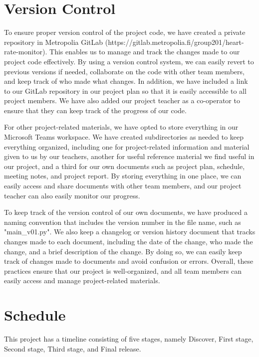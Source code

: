 \documentclass{article}
\begin{document}
\section{Version Control}
To ensure proper version control of the project code, we have created a private repository in Metropolia GitLab (https://gitlab.metropolia.fi/group201/heart-rate-monitor). This enables us to manage and track the changes made to our project code effectively. By using a version control system, we can easily revert to previous versions if needed, collaborate on the code with other team members, and keep track of who made what changes. In addition, we have included a link to our GitLab repository in our project plan so that it is easily accessible to all project members. We have also added our project teacher as a co-operator to ensure that they can keep track of the progress of our code.



For other project-related materials, we have opted to store everything in our Microsoft Teams workspace. We have created subdirectories as needed to keep everything organized, including one for project-related information and material given to us by our teachers, another for useful reference material we find useful in our project, and a third for our own documents such as project plan, schedule, meeting notes, and project report. By storing everything in one place, we can easily access and share documents with other team members, and our project teacher can also easily monitor our progress.

To keep track of the version control of our own documents, we have produced a naming convention that includes the version number in the file name, such as "main\_v01.py". We also keep a changelog or version history document that tracks changes made to each document, including the date of the change, who made the change, and a brief description of the change. By doing so, we can easily keep track of changes made to documents and avoid confusion or errors. Overall, these practices ensure that our project is well-organized, and all team members can easily access and manage project-related materials.

\section{Schedule}

This project has a timeline consisting of five stages, namely Discover, First stage, Second stage, Third stage, and Final release.
\end{document}
